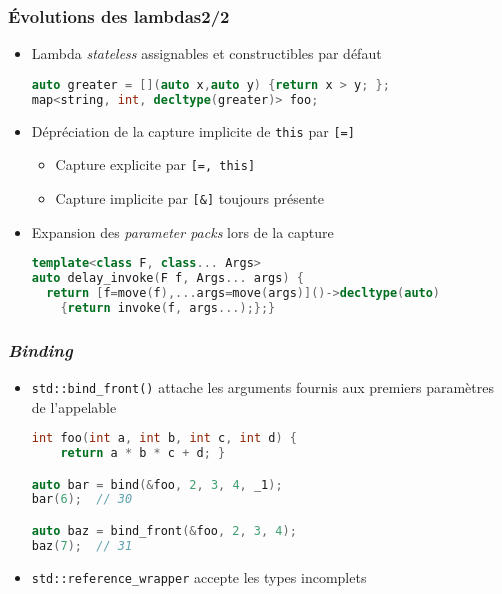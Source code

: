 \documentclass[C++.tex]{subfiles}
\begin{document}
\begin{frame}[fragile]
	\frametitle{Évolutions des lambdas\titlehfill{}2/2}
	\begin{itemize}
		\item Lambda \textit{stateless} assignables et constructibles par défaut


		\begin{lstlisting}[language=C++]
auto greater = [](auto x,auto y) {return x > y; };
map<string, int, decltype(greater)> foo;\end{lstlisting}

		\item Dépréciation de la capture implicite de \lstinline|this| par \lstinline|[=]|
		\begin{itemize}
			\item Capture explicite par \lstinline|[=, this]|
			\item Capture implicite par \lstinline|[&]| toujours présente
		\end{itemize}
		\item Expansion des \textit{parameter packs} lors de la capture

		\begin{lstlisting}[language=C++]
template<class F, class... Args>
auto delay_invoke(F f, Args... args) {
  return [f=move(f),...args=move(args)]()->decltype(auto) 
    {return invoke(f, args...);};}\end{lstlisting}
	\end{itemize}
\end{frame}

\begin{frame}[fragile]
	\frametitle{\textit{Binding}}
	\begin{itemize}
		\item \lstinline|std::bind_front()| attache les arguments fournis aux premiers paramètres de l'appelable

	\begin{lstlisting}[language=C++]
int foo(int a, int b, int c, int d) {
	return a * b * c + d; }

auto bar = bind(&foo, 2, 3, 4, _1);
bar(6);  // 30

auto baz = bind_front(&foo, 2, 3, 4);
baz(7);  // 31\end{lstlisting}

		\item \lstinline|std::reference_wrapper| accepte les types incomplets

	\end{itemize}
\end{frame}
\end{document}
